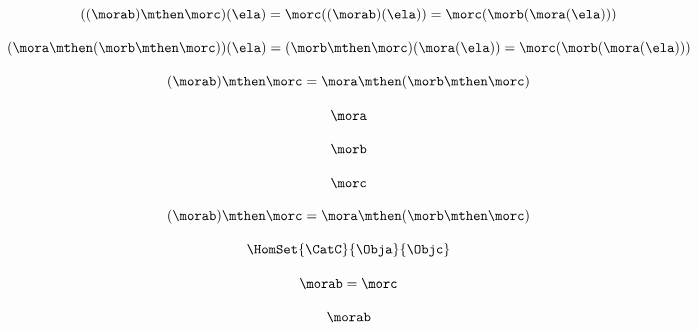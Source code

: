 \begin{forslides}
        
         \begin{equation}
            \label{eq:99}
            ((\morab) \mthen \morc)(\ela) =  \morc((\morab)(\ela)) = \morc (\morb (\mora (\ela)))
        \end{equation}
        
        
         \begin{equation}
            \label{eq:99b}
            (\mora \mthen (\morb \mthen \morc))(\ela)
        =  (\morb \mthen \morc)(\mora(\ela)) = \morc (\morb (\mora (\ela)))
        \end{equation}
        
        
         \begin{equation}
            \label{eq:100}
            (\morab)
        \mthen \morc = \mora \mthen (\morb \mthen \morc)
        \end{equation}
        
        
         \begin{equation}
            \label{eq:101}
            \mora
        \end{equation}
        
        
        
         \begin{equation}
            \label{eq:102}
            \morb
        \end{equation}
        
        
         \begin{equation}
            \label{eq:103}
            \morc
        \end{equation}
        
        
         \begin{equation}
            \label{eq:104}
            (\morab) \mthen \morc = \mora \mthen (\morb \mthen \morc)
        \end{equation}
        
        
         \begin{equation}
            \label{eq:105}
            \HomSet{\CatC}{\Obja}{\Objc}
        \end{equation}
        
        
         \begin{equation}
            \label{eq:106}
            \morab = \morc
        \end{equation}
        
        
         \begin{equation}
            \label{eq:107}
            \morab
        \end{equation}
        

\end{forslides}
